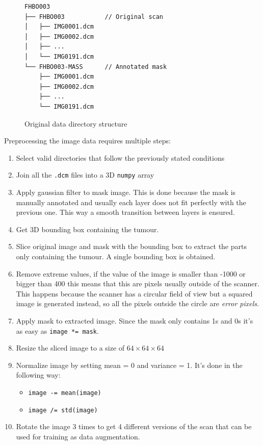 \begin{figure}
  \centering
  \begin{minipage}{0.8\textwidth}
    \begin{Verbatim}[samepage=true]
FHBO003
├── FHBO003           // Original scan
│   ├── IMG0001.dcm
│   ├── IMG0002.dcm
│   ├── ...
│   └── IMG0191.dcm
└── FHBO003-MASS      // Annotated mask
    ├── IMG0001.dcm
    ├── IMG0002.dcm
    ├── ...
    └── IMG0191.dcm
    \end{Verbatim}
  \end{minipage}
    
  \caption{Original data directory structure \label{fig:hnk-raw}}
\end{figure}

Preprocessing the image data requires multiple steps:
\begin{enumerate}
  \item Select valid directories that follow the previously stated conditions
  \item Join all the \verb|.dcm| files into a 3D \verb|numpy| array
  \item Apply gaussian filter to mask image. This is done because the mask is manually annotated
        and usually each layer does not fit perfectly with the previous one. This way a smooth
        transition between layers is ensured.
  \item Get 3D bounding box containing the tumour.
  \item Slice original image and mask with the bounding box to extract the parts only containing
        the tumour. A single bounding box is obtained.
  \item Remove extreme values, if the value of the image is smaller than -1000 or bigger than
        400 this means that this are pixels usually outside of the scanner. This happens because
        the scanner has a circular field of view but a squared image is generated instead, so 
        all the pixels outside the circle are \emph{error pixels}.
  \item Apply mask to extracted image. Since the mask only contains 1s and 0s it's as easy 
        as \verb|image *= mask|.
  \item Resize the sliced image to a size of \( 64 \times 64 \times 64 \)
  \item Normalize image by setting mean = 0 and variance = 1. It's done in the following way:
  \begin{itemize}
    \item \verb|image -= mean(image)|
    \item \verb|image /= std(image)|
  \end{itemize}
  \item Rotate the image 3 times to get 4 different versions of the scan that can be used for 
        training as data augmentation.
\end{enumerate}

